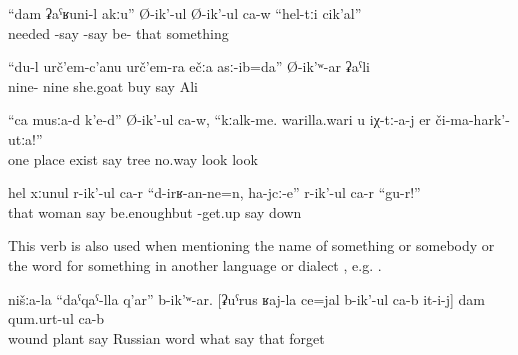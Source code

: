\begin{exe}
	\ex	\label{ex:He says, I do not need these things}
	\gll	``dam	ʡaˁʁuni-l	akːu''	Ø-ik'-ul	Ø-ik'-ul ca-w	``hel-tːi	cik'al''\\
			needed		-say	-say be-	that	something\\
	\glt	{}

	\ex	\label{ex:‎‎‎I bought 99 goats, said Ali}
	\gll	``du-l	urč'em-c'anu	urč'em-ra	ečːa	asː-ib=da''	Ø-ik'ʷ-ar	ʡaˁli	\\
			nine-	nine	she.goat	buy	say	Ali\\
	\glt	{}

	\ex	\label{ex:‎‎In once place, there are, he says, trees. Whatever may happen, do not look at these trees}
	\gll	``ca	musːa-d	k'e-d''	Ø-ik'-ul	ca-w,	``kːalk-me.	warilla.wari	u	iχ-tː-a-j	er	či-ma-hark'-utːa!''\\
		one	place	exist	say		tree	no.way			look	look\\
	\glt	{}

	\ex	\label{ex:‎‎The wife says, This is enough, get up}
	\gll	hel	xːunul	r-ik'-ul	ca-r	``d-irʁ-an-ne=n,	ha-jcː-e''	r-ik'-ul	ca-r	``gu-r!''\\
		that	woman	say		be.enoughbut	-get.up	say		down\\
	\glt	{}
\end{exe}

This verb is also used when mentioning the name of something or somebody or the word for something in another language or dialect , e.g.  .
%
\begin{exe}
	\ex	\label{ex:‎‎In our (language) it is called plant of the wound I forgot what it is called in Russian}
	\gll	nišːa-la	``daˁqaˁ-lla	q'ar''	b-ik'ʷ-ar.	[ʡuˁrus	ʁaj-la	ce=jal	b-ik'-ul	ca-b	it-i-j] dam	qum.urt-ul	ca-b\\
			wound	plant	say	Russian word	what	say		that		forget	\\
	\glt	{}
\end{exe}

